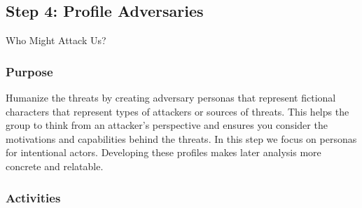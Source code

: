 \subsection{Step 4: Profile Adversaries}
\label{subsec:Step4}

Who Might Attack Us?

\subsubsection{Purpose}

Humanize the threats by creating adversary personas that represent fictional
characters that represent types of attackers or sources of threats. This helps the
group to think from an attacker's perspective and ensures you consider the
motivations and capabilities behind the threats. In this step we focus on personas for
intentional actors. Developing these profiles makes later analysis more
concrete and relatable.

\subsubsection{Activities}

